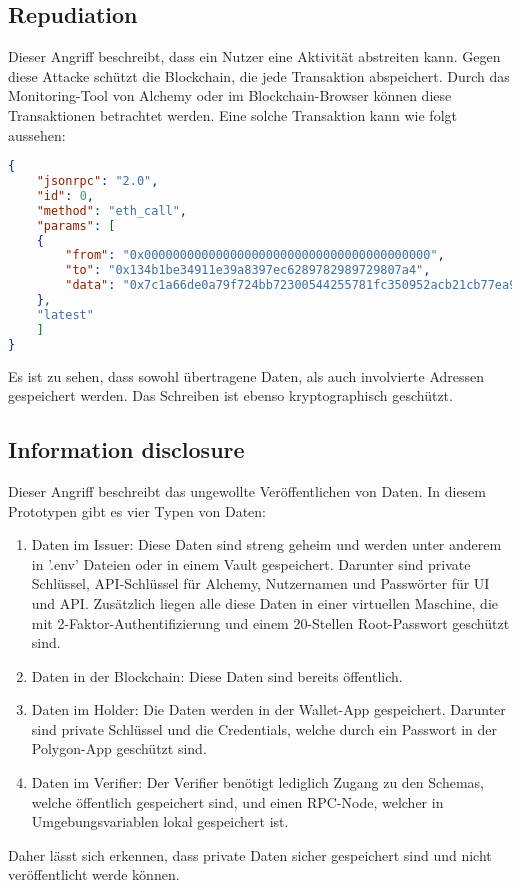 \subsection{Repudiation}
\label{Repudiation}
Dieser Angriff beschreibt, dass ein Nutzer eine Aktivität abstreiten kann. Gegen diese Attacke schützt die Blockchain, die jede Transaktion abspeichert. Durch das Monitoring-Tool von Alchemy oder im Blockchain-Browser können diese Transaktionen betrachtet werden. Eine solche Transaktion kann wie folgt aussehen:

\begin{lstlisting}[language=json,firstnumber=1]
{
	"jsonrpc": "2.0",
	"id": 0,
	"method": "eth_call",
	"params": [
	{
		"from": "0x0000000000000000000000000000000000000000",
		"to": "0x134b1be34911e39a8397ec6289782989729807a4",
		"data": "0x7c1a66de0a79f724bb72300544255781fc350952acb21cb77ea9a719c8eebb7d1a055ad0"
	},
	"latest"
	]
}
\end{lstlisting}	
Es ist zu sehen, dass sowohl übertragene Daten, als auch involvierte Adressen gespeichert werden. Das Schreiben ist ebenso kryptographisch geschützt.

\subsection{Information disclosure}
\label{disclosure}
Dieser Angriff beschreibt das ungewollte Veröffentlichen von Daten. In diesem Prototypen gibt es vier Typen von Daten:
\begin{enumerate}
	\item Daten im Issuer: Diese Daten sind streng geheim und werden unter anderem in '.env' Dateien oder in einem Vault gespeichert. Darunter sind private Schlüssel, API-Schlüssel für Alchemy, Nutzernamen und Passwörter für UI und API. Zusätzlich liegen alle diese Daten in einer virtuellen Maschine, die mit 2-Faktor-Authentifizierung und einem 20-Stellen Root-Passwort geschützt sind.
	\item Daten in der Blockchain: Diese Daten sind bereits öffentlich.
	\item Daten im Holder: Die Daten werden in der Wallet-App gespeichert. Darunter sind private Schlüssel und die Credentials, welche durch ein Passwort in der Polygon-App geschützt sind.
	\item Daten im Verifier: Der Verifier benötigt lediglich Zugang zu den Schemas, welche öffentlich gespeichert sind, und einen RPC-Node, welcher in Umgebungsvariablen lokal gespeichert ist.
\end{enumerate}
Daher lässt sich erkennen, dass private Daten sicher gespeichert sind und nicht veröffentlicht werde können.

